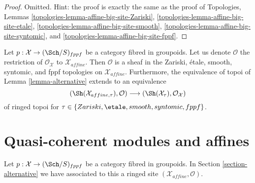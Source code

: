 \begin{proof}
Omitted. Hint: the proof is exactly the same as the proof of
Topologies, Lemmas
\ref{topologies-lemma-affine-big-site-Zariski},
\ref{topologies-lemma-affine-big-site-etale},
\ref{topologies-lemma-affine-big-site-smooth},
\ref{topologies-lemma-affine-big-site-syntomic}, and
\ref{topologies-lemma-affine-big-site-fppf}.
\end{proof}

\noindent
Let $p : \mathcal{X} \to (\Sch/S)_{fppf}$ be a category fibred in groupoids.
Let us denote $\mathcal{O}$ the restriction of $\mathcal{O}_\mathcal{X}$
to $\mathcal{X}_{affine}$. Then $\mathcal{O}$ is a sheaf in the
Zariski, \'etale, smooth, syntomic, and fppf topologies on
$\mathcal{X}_{affine}$. Furthermore, the equivalence of topoi of
Lemma \ref{lemma-alternative} extends to an equivalence
\begin{equation}
\label{equation-alternative-ringed}
(\Sh(\mathcal{X}_{affine, \tau}), \mathcal{O})
\longrightarrow
(\Sh(\mathcal{X}_\tau), \mathcal{O}_\mathcal{X})
\end{equation}
of ringed topoi for $\tau \in \{Zariski, \etale, smooth, syntomic, fppf\}$.









\section{Quasi-coherent modules and affines}
\label{section-alternative-quasi-coherent}

\noindent
Let $p : \mathcal{X} \to (\Sch/S)_{fppf}$ be a category fibred in groupoids.
In Section \ref{section-alternative} we have associated to this a ringed site
$(\mathcal{X}_{affine}, \mathcal{O})$.

